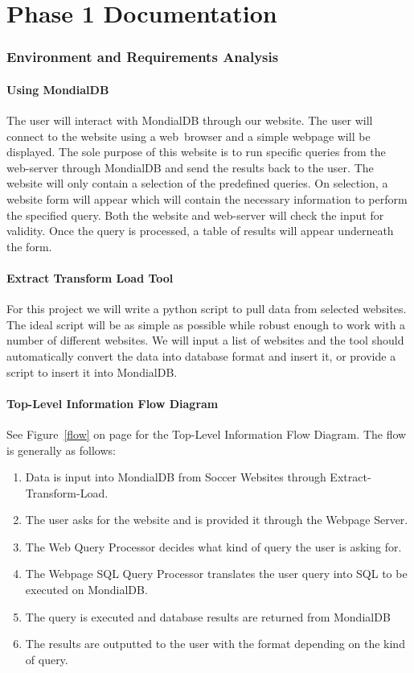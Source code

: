 \documentclass{article}
\begin{document}
\part{Phase 1 Documentation}
\section{Environment and Requirements Analysis}

\subsection{Using MondialDB}
The user will interact with MondialDB through our website. The user will connect to the website using a web~browser and a simple webpage will be displayed. The sole purpose of this website is to run specific queries from the web-server through MondialDB and send the results back to the user. The website will only contain a selection of the predefined queries. On selection, a website form will appear which will contain the necessary information to perform the specified query. Both the website and web-server will check the input for validity. Once the query is processed, a table of results will appear underneath the form.

\subsection{Extract Transform Load Tool} 
For this project we will write a python script to pull data from selected websites. The ideal script will be as simple as possible while robust enough to work with a number of different websites. We will input a list of websites and the tool should automatically convert the data into database format and insert it, or provide a script to insert it into MondialDB.

\subsection{Top-Level Information Flow Diagram}
See Figure~\ref{flow} on page \pageref{flow} for the Top-Level Information Flow Diagram. The flow is generally as follows:

\begin{enumerate}
\item Data is input into MondialDB from Soccer Websites through Extract-Transform-Load. 
\item The user asks for the website and is provided it through the Webpage Server.
\item The Web Query Processor decides what kind of query the user is asking for.
\item The Webpage SQL Query Processor translates the user query into SQL to be executed on MondialDB.
\item The query is executed and database results are returned from MondialDB
\item The results are outputted to the user with the format depending on the kind of query.
\end{enumerate}
\end{document}

